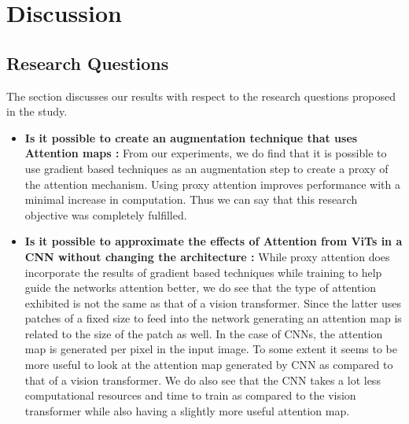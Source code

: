 \chapter{Discussion} \label{ch:discussion}
\section{Research Questions}

 
The section discusses our results with respect to the research questions proposed in the study.
\begin{itemize}
\item \textbf{Is it possible to create an augmentation technique that uses Attention maps :} From our experiments, we do find that it is possible to use gradient based techniques as an augmentation step to create a proxy of the attention mechanism. Using proxy attention improves performance with a minimal increase in computation. Thus we can say that this research objective was completely fulfilled.
\item \textbf{Is it possible to approximate the effects of Attention from ViTs in a CNN without changing the architecture :} While proxy attention does incorporate the results of gradient based techniques while training to help guide the networks attention better, we do see that the type of attention exhibited is not the same as that of a vision transformer. Since the latter uses patches of a fixed size to feed into the network generating an attention map is related to the size of the patch as well. In the case of CNNs, the attention map is generated per pixel in the input image. To some extent it seems to be more useful to look at the attention map generated by CNN as compared to that of a vision transformer. We do also see that the CNN takes a lot less computational resources and time to train as compared to the vision transformer while also having a slightly more useful attention map. 


\end{itemize}
